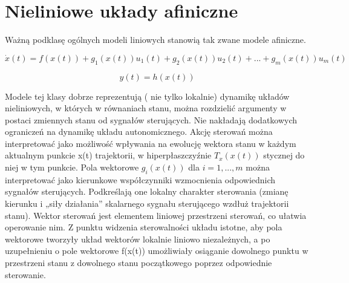 \documentclass{article}
\begin{document}
		\section{Nieliniowe układy afiniczne}

		Ważną podklasę ogólnych modeli liniowych stanowią tak zwane modele afiniczne.

		\begin{equation}
			\dot{x}(t) = f(x(t)) + g_1(x(t))u_1(t) + g_2(x(t))u_2(t) + ...
			+ g_m(x(t))u_m(t) 
		\end{equation}

		\begin{equation}
			y(t) = h(x(t))
		\end{equation}

		Modele tej klasy dobrze reprezentują ( nie tylko lokalnie) dynamikę 
		układów nieliniowych, w których w równaniach stanu, można rozdzielić argumenty
		w postaci zmiennych stanu od sygnałów sterujących. Nie nakładają dodatkowych 
		ograniczeń na dynamikę układu
		autonomicznego. Akcję sterowań można interpretować jako możliwość wpływania na
		ewolucję wektora stanu w każdym aktualnym punkcie x(t) trajektorii, w hiperpłaszczyźnie
		$T_x(x(t))$ stycznej do niej w tym punkcie. Pola wektorowe $g_i(x(t))$  dla 
		$i= 1, ... , m$ można
		interpretować jako kierunkowe współczynniki wzmocnienia odpowiednich sygnałów
		sterujących. Podkreślają one lokalny charakter sterowania (zmianę kierunku i „siły działania”
		skalarnego sygnału sterującego wzdłuż trajektorii stanu). Wektor sterowań jest elementem
		liniowej przestrzeni sterowań, co ułatwia operowanie nim. Z punktu widzenia sterowalności
		układu istotne, aby pola wektorowe tworzyły układ wektorów lokalnie liniowo niezależnych,
		a po uzupełnieniu o pole wektorowe f(x(t))
		umożliwiały osiąganie dowolnego punktu w
		przestrzeni stanu z dowolnego stanu początkowego poprzez odpowiednie sterowanie.
\end{document}
